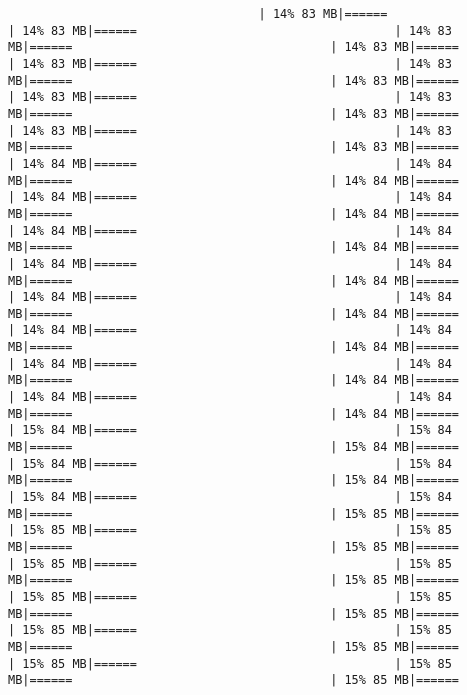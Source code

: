 \documentclass[
]{article}
\begin{document}
\begin{verbatim}
                                   | 14% 83 MB|======                                    | 14% 83 MB|======                                    | 14% 83 MB|======                                    | 14% 83 MB|======                                    | 14% 83 MB|======                                    | 14% 83 MB|======                                    | 14% 83 MB|======                                    | 14% 83 MB|======                                    | 14% 83 MB|======                                    | 14% 83 MB|======                                    | 14% 83 MB|======                                    | 14% 83 MB|======                                    | 14% 83 MB|======                                    | 14% 84 MB|======                                    | 14% 84 MB|======                                    | 14% 84 MB|======                                    | 14% 84 MB|======                                    | 14% 84 MB|======                                    | 14% 84 MB|======                                    | 14% 84 MB|======                                    | 14% 84 MB|======                                    | 14% 84 MB|======                                    | 14% 84 MB|======                                    | 14% 84 MB|======                                    | 14% 84 MB|======                                    | 14% 84 MB|======                                    | 14% 84 MB|======                                    | 14% 84 MB|======                                    | 14% 84 MB|======                                    | 14% 84 MB|======                                    | 14% 84 MB|======                                    | 14% 84 MB|======                                    | 14% 84 MB|======                                    | 14% 84 MB|======                                    | 14% 84 MB|======                                    | 14% 84 MB|======                                    | 14% 84 MB|======                                    | 15% 84 MB|======                                    | 15% 84 MB|======                                    | 15% 84 MB|======                                    | 15% 84 MB|======                                    | 15% 84 MB|======                                    | 15% 84 MB|======                                    | 15% 84 MB|======                                    | 15% 84 MB|======                                    | 15% 85 MB|======                                    | 15% 85 MB|======                                    | 15% 85 MB|======                                    | 15% 85 MB|======                                    | 15% 85 MB|======                                    | 15% 85 MB|======                                    | 15% 85 MB|======                                    | 15% 85 MB|======                                    | 15% 85 MB|======                                    | 15% 85 MB|======                                    | 15% 85 MB|======                                    | 15% 85 MB|======                                    | 15% 85 MB|======                                    | 15% 85 MB|======                                    | 15% 85 MB|======                                    | 15% 85 MB|======                          
\end{verbatim}
\end{document}

